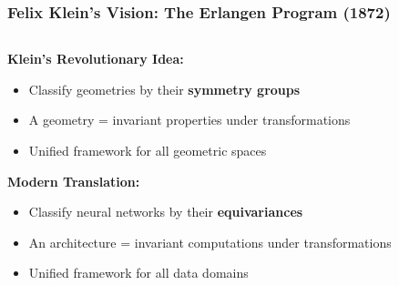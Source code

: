 \begin{frame}[fragile]\frametitle{Felix Klein's Vision: The Erlangen Program (1872)}

\begin{columns}
\begin{column}{0.6\textwidth}
\textbf{Klein's Revolutionary Idea:}
\begin{itemize}
\item Classify geometries by their \textbf{symmetry groups}
\item A geometry = invariant properties under transformations
\item Unified framework for all geometric spaces
\end{itemize}

\vspace{0.5cm}
\textbf{Modern Translation:}
\begin{itemize}
\item Classify neural networks by their \textbf{equivariances}
\item An architecture = invariant computations under transformations  
\item Unified framework for all data domains
\end{itemize}
\end{column}
\begin{column}{0.4\textwidth}

\end{column}
\end{columns}

\end{frame}


